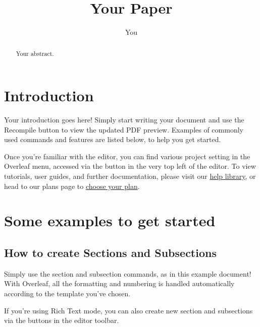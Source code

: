 \documentclass{article}
\title{Your Paper}
\author{You}
\begin{document}
\maketitle

\begin{abstract}
Your abstract.
\end{abstract}

\long{}
\long{}
\long{}
\long{}

\section{Introduction}


Your introduction goes here! Simply start writing your document and use the Recompile button to view the updated PDF preview. Examples of commonly used commands and features are listed below,  to help you get started.


Once you're familiar with the editor, you can find various project setting in the Overleaf menu, accessed via the button in the very top left of the editor. To view tutorials, user guides, and further documentation, please visit our \href{https://www.overleaf.com/learn}{help library}, or head to our plans page to \href{https://www.overleaf.com/user/subscription/plans}{choose your plan}.

\section{Some examples to get started}


\subsection{How to create Sections and Subsections}

Simply use the section and subsection commands, as in this example document! With Overleaf, all the formatting and numbering is handled automatically according to the template you've chosen. 


If you're using Rich Text mode, you can also create new section and subsections via the buttons in the editor toolbar.
\end{document}
